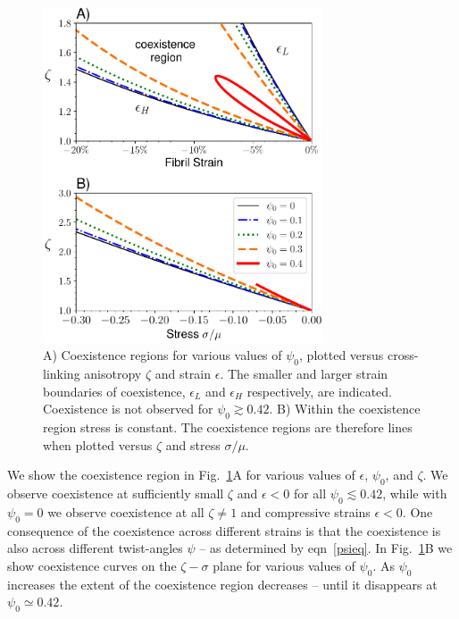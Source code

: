 \documentclass[twoside,twocolumn,9pt]{article}
\begin{document}
\begin{figure}[t!] %
\begin{centering}
  \includegraphics[width=8.3cm]{Figure_2.pdf}
  \caption{A) Coexistence regions for various values of $\psi_0$, plotted versus cross-linking anisotropy $\zeta$ and strain $\epsilon$. The smaller and larger strain boundaries of coexistence, $\epsilon_L$ and $\epsilon_H$ respectively, are indicated. Coexistence is not observed for $\psi_0 \gtrsim 0.42$. B) Within the coexistence region stress is constant. The coexistence regions are therefore lines when plotted versus $\zeta$ and stress $\sigma/\mu$.}
  \label{fig:coexistence}
  \end{centering}
\end{figure}

We show the coexistence region in Fig.~\ref{fig:coexistence}A for various values of $\epsilon$, $\psi_0$, and $\zeta$. We observe coexistence at sufficiently small $\zeta$ and $\epsilon<0$ for all $\psi_0 \lesssim 0.42$, while with $\psi_0=0$ we observe coexistence at all $\zeta \neq 1$ and compressive strains $\epsilon < 0$. One consequence of the coexistence across different strains is that the coexistence is also across different twist-angles $\psi$ -- as determined by eqn~\eqref{psieq}.  In Fig.~\ref{fig:coexistence}B we show coexistence curves on the $\zeta-\sigma$ plane for various values of $\psi_0$. As $\psi_0$ increases the extent of the coexistence region decreases -- until it disappears at $\psi_0 \simeq 0.42$.
\end{document}
